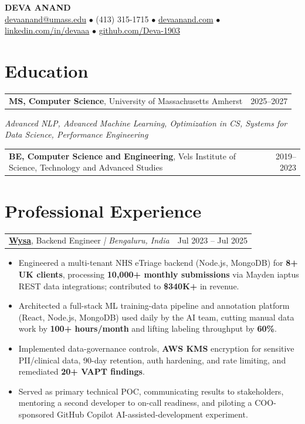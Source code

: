 \documentclass[letterpaper,11pt]{article}
\makeatletter
\newcommand{\eduItem}[3]{%
  \begin{tabular*}{\textwidth}{@{}l@{\extracolsep{\fill}}r@{}}
    \textbf{#1}, #2 & #3 \\
  \end{tabular*}\par
}
\newcommand{\expItem}[4]{%
  \vspace{3pt}
  \begin{tabular*}{\textwidth}{@{}l@{\extracolsep{\fill}}r@{}}
    \textbf{#1}, #2 \textit{| #3} & #4 \\
  \end{tabular*}\par\vspace{-2pt}
}
\makeatother
\begin{document}
\begin{center}
    {\fontsize{18}{20}\selectfont\bfseries DEVA ANAND}\\ \vspace{3pt}
    {\small
    \href{mailto:devaanand@umass.edu}{devaanand@umass.edu}
    \enspace$\bullet$\enspace
    (413) 315-1715
    \enspace$\bullet$\enspace
    \href{https://devaanand.com}{devaanand.com}
    \enspace$\bullet$\enspace
    \href{https://linkedin.com/in/devaaa/}{linkedin.com/in/devaaa}
    \enspace$\bullet$\enspace
    \href{https://github.com/Deva-1903}{github.com/Deva-1903}}
\end{center}
\vspace{-6pt}

\section{Education}
\eduItem{MS, Computer Science}{University of Massachusetts Amherst}{2025--2027}
{\small\textit{Advanced NLP, Advanced Machine Learning, Optimization in CS, Systems for Data Science, Performance Engineering}}\par
\vspace{3pt}
\eduItem{BE, Computer Science and Engineering}{Vels Institute of Science, Technology and Advanced Studies}{2019--2023}

\section{Professional Experience}

\expItem{\href{https://www.wysa.io}{Wysa}}{Backend Engineer}{Bengaluru, India}{Jul 2023 -- Jul 2025}
\begin{itemize}
  \item Engineered a multi-tenant NHS eTriage backend (Node.js, MongoDB) for \textbf{8+ UK clients}, processing \textbf{10{,}000+ monthly submissions} via Mayden iaptus REST data integrations; contributed to \textbf{\$340K+} in revenue.
  \item Architected a full-stack ML training-data pipeline and annotation platform (React, Node.js, MongoDB) used daily by the AI team, cutting manual data work by \textbf{100+ hours/month} and lifting labeling throughput by \textbf{60\%}.
  \item Implemented data-governance controls, \textbf{AWS KMS} encryption for sensitive PII/clinical data, 90-day retention, auth hardening, and rate limiting, and remediated \textbf{20+ VAPT findings}.
  \item Served as primary technical POC, communicating results to stakeholders, mentoring a second developer to on-call readiness, and piloting a COO-sponsored GitHub Copilot AI-assisted-development experiment.
\end{itemize}
\end{document}
